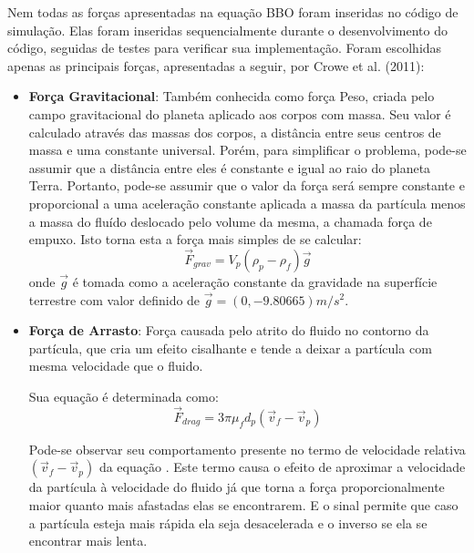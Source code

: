 Nem todas as forças apresentadas na equação BBO foram inseridas no código de simulação.
Elas foram inseridas sequencialmente durante o desenvolvimento do código, seguidas de testes para verificar sua implementação.
Foram escolhidas apenas as principais forças, apresentadas a seguir, por Crowe et al. (2011)\cite{crowe}: 
\begin{itemize}
    \item \textbf{Força Gravitacional}:
        Também conhecida como força Peso, criada pelo campo gravitacional do planeta aplicado aos corpos com massa.
        Seu valor é calculado através das massas dos corpos, a distância entre seus centros de massa e uma constante universal.
        Porém, para simplificar o problema, pode-se assumir que a distância entre eles é constante e igual ao raio do planeta Terra.
        Portanto, pode-se assumir que o valor da força será sempre constante e proporcional a uma aceleração constante aplicada a massa da partícula menos a massa do fluído deslocado pelo volume da mesma, a chamada força de empuxo.
        Isto torna esta a força mais simples de se calcular:
        \begin{equation}
            \vec{F}_{grav} = V_p (\rho_p - \rho_f) \vec{g}
            \label{grav}
        \end{equation}
        onde $\vec{g}$ é tomada como a aceleração constante da gravidade na superfície terrestre com valor definido de $\vec{g} = (0, -9.80665)m/s^2$.

    \item \textbf{Força de Arrasto}:
        Força causada pelo atrito do fluido no contorno da partícula, que cria um efeito cisalhante e tende a deixar a partícula com mesma velocidade que o fluido.

        Sua equação é determinada como:
        \begin{equation}
            \vec{F}_{drag} = 3 \pi \mu_f d_p \left(\vec{v}_{f} - \vec{v}_{p} \right)
            \label{drag}
        \end{equation}

        Pode-se observar seu comportamento presente no termo de velocidade relativa $\left(\vec{v}_{f} - \vec{v}_{p} \right)$ da equação .
        Este termo causa o efeito de aproximar a velocidade da partícula à velocidade do fluido já que torna a força proporcionalmente maior quanto mais afastadas elas se encontrarem.
        E o sinal permite que caso a partícula esteja mais rápida ela seja desacelerada e o inverso se ela se encontrar mais lenta. 


\end{itemize}
